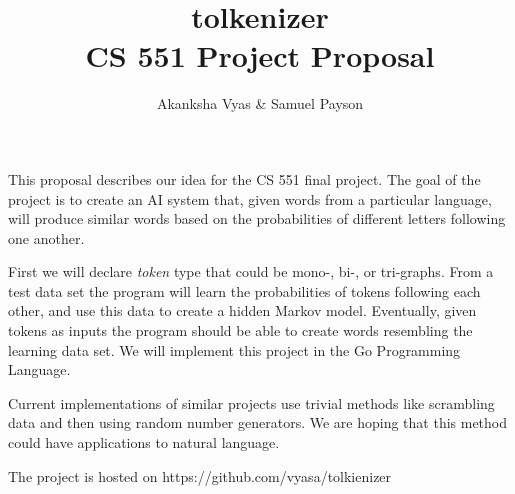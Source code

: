 \documentclass[12pt]{article}
\title{tolkenizer \\ \small{CS 551 Project Proposal}}
\author{Akanksha Vyas \& Samuel Payson}
\begin{document}
\maketitle

This proposal describes our idea for the CS 551 final project. The goal of the
project is to create an AI system that, given words from a particular language,
will produce similar words based on the probabilities of different letters
following one another.

First we will declare \textit{token} type that could be mono-, bi-, or tri-graphs.
From a test data set the program will learn the probabilities of tokens following 
each other, and use this data to create a hidden Markov model.
Eventually, given tokens as inputs the program should be able to create words 
resembling the learning data set. We will implement this project in the Go 
Programming Language.

Current implementations of similar projects use trivial methods like scrambling
data and then using random number generators. We are hoping that this method 
could have applications to natural language.

The project is hosted on https://github.com/vyasa/tolkienizer
\end{document}
